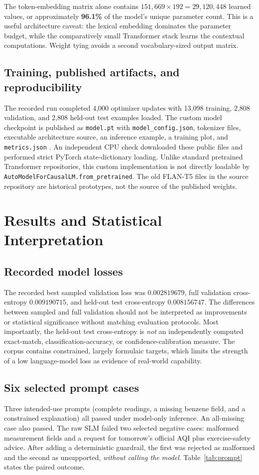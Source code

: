 \documentclass[conference,a4paper,10pt]{IEEEtran}
\begin{document}
The token-embedding matrix alone contains $151{,}669\times192=29{,}120{,}448$ learned values, or approximately \textbf{96.1\%} of the model's unique parameter count. This is a useful architecture caveat: the lexical embedding dominates the parameter budget, while the comparatively small Transformer stack learns the contextual computations. Weight tying avoids a second vocabulary-sized output matrix.

\subsection{Training, published artifacts, and reproducibility}
The recorded run completed 4,000 optimizer updates with 13,098 training, 2,808 validation, and 2,808 held-out test examples loaded. The custom model checkpoint is published as \texttt{model.pt} with \texttt{model\_config.json}, tokenizer files, executable architecture source, an inference example, a training plot, and \texttt{metrics.json} \cite{modelrepo}. An independent CPU check downloaded these public files and performed strict PyTorch state-dictionary loading. Unlike standard pretrained Transformer repositories, this custom implementation is not directly loadable by \texttt{AutoModelForCausalLM.from\_pretrained}. The old FLAN-T5 files in the source repository are historical prototypes, not the source of the published weights.

\section{Results and Statistical Interpretation}
\subsection{Recorded model losses}
The recorded best sampled validation loss was $0.002819679$, full validation cross-entropy $0.009190715$, and held-out test cross-entropy $0.008156747$. The differences between sampled and full validation should not be interpreted as improvements or statistical significance without matching evaluation protocols. Most importantly, the held-out test cross-entropy is \emph{not} an independently computed exact-match, classification-accuracy, or confidence-calibration measure. The corpus contains constrained, largely formulaic targets, which limits the strength of a low language-model loss as evidence of real-world capability.

\subsection{Six selected prompt cases}
Three intended-use prompts (complete readings, a missing benzene field, and a constrained explanation) all passed under model-only inference. An all-missing case also passed. The raw SLM failed two selected negative cases: malformed measurement fields and a request for tomorrow's official AQI plus exercise-safety advice. After adding a deterministic guardrail, the first was rejected as malformed and the second as unsupported, \emph{without calling the model}. Table~\ref{tab:prompt} states the paired outcome.
\end{document}

